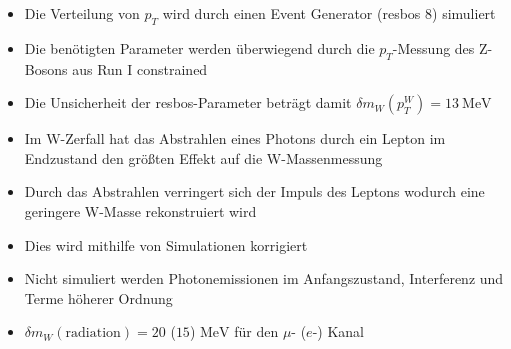 \documentclass[aspectratio=1610, 9pt]{beamer}
\begin{document}
\begin{frame}
  \begin{itemize}
    \item Die Verteilung von $p_T$ wird durch einen Event Generator (resbos 8) simuliert
    \item Die benötigten Parameter werden überwiegend durch die $p_T$-Messung des Z-Bosons aus Run I constrained
    \item Die Unsicherheit der resbos-Parameter beträgt damit $\delta m_W (p^W_T) = \SI{13}{\MeV}$
  \end{itemize}


\end{frame}

\begin{frame}
  \begin{itemize}
    \item Im W-Zerfall hat das Abstrahlen eines Photons durch ein Lepton im Endzustand den größten Effekt auf die W-Massenmessung
    \item Durch das Abstrahlen verringert sich der Impuls des Leptons wodurch eine geringere W-Masse rekonstruiert wird
    \item Dies wird mithilfe von Simulationen korrigiert
    \item Nicht simuliert werden Photonemissionen im Anfangszustand, Interferenz und Terme höherer Ordnung
    \item[\rightarrow] $\delta m_W (\text{radiation})= \num{20}$ ($\num{15}$) $\si{\MeV}$ für den $\mu$- ($e$-) Kanal

  \end{itemize}
\end{frame}
\end{document}
